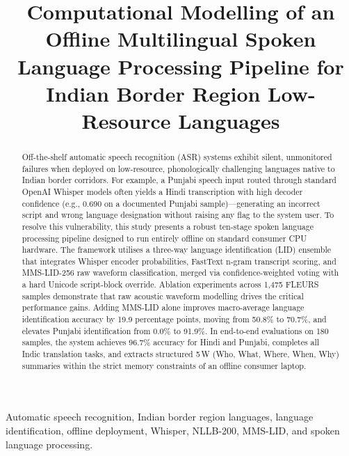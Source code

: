 \documentclass[conference]{IEEEtran}
\begin{document}
\title{Computational Modelling of an Offline Multilingual Spoken Language Processing Pipeline for Indian Border Region Low-Resource Languages}

\author{%
}

\maketitle

\begin{abstract}
Off-the-shelf automatic speech recognition (ASR) systems exhibit silent, unmonitored failures when deployed on low-resource, phonologically challenging languages native to Indian border corridors. For example, a Punjabi speech input routed through standard OpenAI Whisper models often yields a Hindi transcription with high decoder confidence (e.g., 0.690 on a documented Punjabi sample)---generating an incorrect script and wrong language designation without raising any flag to the system user. To resolve this vulnerability, this study presents a robust ten-stage spoken language processing pipeline designed to run entirely offline on standard consumer CPU hardware. The framework utilises a three-way language identification (LID) ensemble that integrates Whisper encoder probabilities, FastText n-gram transcript scoring, and MMS-LID-256 raw waveform classification, merged via confidence-weighted voting with a hard Unicode script-block override. Ablation experiments across 1,475 FLEURS samples demonstrate that raw acoustic waveform modelling drives the critical performance gains. Adding MMS-LID alone improves macro-average language identification accuracy by 19.9 percentage points, moving from 50.8\% to 70.7\%, and elevates Punjabi identification from 0.0\% to 91.9\%. In end-to-end evaluations on 180 samples, the system achieves 96.7\% accuracy for Hindi and Punjabi, completes all Indic translation tasks, and extracts structured 5\,W (Who, What, Where, When, Why) summaries within the strict memory constraints of an offline consumer laptop.
\end{abstract}

\begin{IEEEkeywords}
Automatic speech recognition, Indian border region languages, language identification, offline deployment, Whisper, NLLB-200, MMS-LID, and spoken language processing.
\end{IEEEkeywords}
\end{document}
